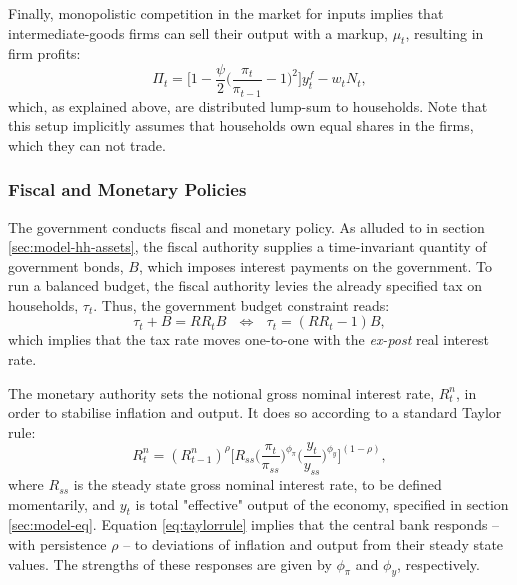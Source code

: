 \documentclass[12pt]{article} %
\numberwithin{equation}{section} %
\numberwithin{figure}{section}
\numberwithin{table}{section}
\begin{document}
Finally, monopolistic competition in the market for inputs implies that intermediate-goods firms can sell their output with a markup, $\mu_t$, resulting in firm profits:
\begin{equation}
    \Pi_t = \Bigg[ 1 - \frac{\psi}{2} \Bigg( \frac{\pi_t}{\pi_{t-1}} - 1 \Bigg)^2 \Bigg] y_t^f - w_t N_t, \label{eq:firms-profits}
\end{equation}
which, as explained above, are distributed lump-sum to households. Note that this setup implicitly assumes that households own equal shares in the firms, which they can not trade.


\subsubsection{Fiscal and Monetary Policies}
\label{sec:model-policy}

The government conducts fiscal and monetary policy. As alluded to in section \ref{sec:model-hh-assets}, the fiscal authority supplies a time-invariant quantity of government bonds, $B$, which imposes interest payments on the government. To run a balanced budget, the fiscal authority levies the already specified tax on households, $\tau_t$. Thus, the government budget constraint reads:
\begin{equation}
    \tau_t + B = RR_t B \ \ \ \Leftrightarrow \ \ \ \tau_t = (RR_t - 1)B, \label{eq:fiscal-budget}
\end{equation}
which implies that the tax rate moves one-to-one with the \textit{ex-post} real interest rate.

The monetary authority sets the notional gross nominal interest rate, $R_{t}^n$, in order to stabilise inflation and output. It does so according to a standard Taylor rule:
\begin{equation}
    R_{t}^n = ( R_{t-1}^n )^{\rho} \Bigg[ R_{ss} \Bigg( \frac{\pi_t}{\pi_{ss}} \Bigg)^{\phi_{\pi}} \Bigg( \frac{y_t}{y_{ss}} \Bigg)^{\phi_y} \Bigg]^{(1-\rho)}, \label{eq:taylorrule}
\end{equation}
where $R_{ss}$ is the steady state gross nominal interest rate, to be defined momentarily, and $y_t$ is total "effective" output of the economy, specified in section \ref{sec:model-eq}. Equation \eqref{eq:taylorrule} implies that the central bank responds -- with persistence $\rho$ -- to deviations of inflation and output from their steady state values. The strengths of these responses are given by $\phi_{\pi}$ and $\phi_y$, respectively. 
\end{document}
